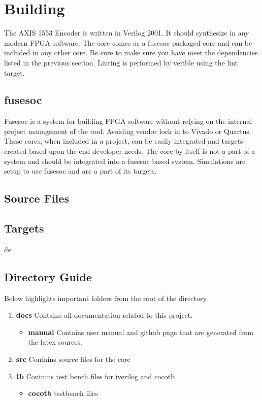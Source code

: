\section{Building}

\par
The AXIS 1553 Encoder is written in Verilog 2001. It should synthesize in any modern FPGA software. The core comes as a fusesoc packaged core and can be included in any other core. Be sure to make sure you have meet the dependencies listed in the previous section. Linting is performed by verible using the lint target.

\subsection{fusesoc}
\par
Fusesoc is a system for building FPGA software without relying on the internal project management of the tool. Avoiding vendor lock in to Vivado or Quartus.
These cores, when included in a project, can be easily integrated and targets created based upon the end developer needs. The core by itself is not a part of
a system and should be integrated into a fusesoc based system. Simulations are setup to use fusesoc and are a part of its targets.

\subsection{Source Files}



\subsection{Targets}

de

\subsection{Directory Guide}

\par
Below highlights important folders from the root of the directory.

\begin{enumerate}
  \item \textbf{docs} Contains all documentation related to this project.
    \begin{itemize}
      \item \textbf{manual} Contains user manual and github page that are generated from the latex sources.
    \end{itemize}
  \item \textbf{src} Contains source files for the core
  \item \textbf{tb} Contains test bench files for iverilog and cocotb
    \begin{itemize}
      \item \textbf{cocotb} testbench files
    \end{itemize}
\end{enumerate}

